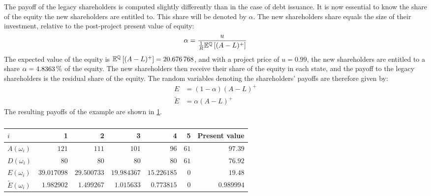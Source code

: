 \documentclass[main.tex]{subfiles}
\begin{document}
        The payoff of the legacy shareholders is computed slightly differently than in the case of debt issuance. 
        It is now essential to know the share of the equity the new shareholders are entitled to.
        This share will be denoted by $\alpha$.
        The new shareholders share equals the size of their investment,
        relative to the post-project present value of equity:
        \begin{equation*}
            \alpha = 
                \frac{
                    u
                }{
                    \frac{1}{R}
                    \mathbb{E}^{\mathbb{Q}}\left[
                        (A - L)^{+}
                    \right]
                }
        \end{equation*}
        The expected value of the equity is 
        $\mathbb{E}^{\mathbb{Q}}\left[(A - L)^{+}\right] = \num{20.676768}$,
        and with a project price of $u = 0.99$, the new shareholders are entitled to a share
        $\alpha = \pct{0.048363}$ of the equity.
        The new shareholders then receive their share of the equity in each state, 
        and the payoff to the legacy shareholders is the residual share of the equity.
        The random variables denoting the shareholders' payoffs are therefore given by:
            \begin{align*}
                E 
                &= 
                (1 - \alpha)
                (A - L)^{+} 
                \\
                \tilde{E}
                &=
                \alpha
                (A - L)^{+}
            \end{align*}
        The resulting payoffs of the example are shown in \cref{tbl:equity-funding-payoff}.
        \begin{table}[H]
            \centering\begin{tabular}{l|rrrrr||r}
                $i$ & 1 & 2 & 3 & 4 & 5 & Present value \\
                \hline
                $A(\omega_{i})$ & $\num{121}$ & $\num{111}$ & $\num{101}$ & $\num{96}$ & $\num{61}$ & $\num{97.39}$ \\
                $D(\omega_{i})$ & $\num{80}$ & $\num{80}$ & $\num{80}$ & $\num{80}$ & $\num{61}$ & $\num{76.92}$ \\
                $E(\omega_{i})$ & $\num{39.017098}$ & $\num{29.500733}$ & $\num{19.984367}$ & $\num{15.226185}$ & $\num{0}$ & $\num{19.48}$ \\
                $\tilde{E}(\omega_{i})$ & $\num{1.982902}$ & $\num{1.499267}$ & $\num{1.015633}$ & $\num{0.773815}$ & $\num{0}$ & $\num{0.989994}$ \\
            \end{tabular}
            \caption{}
            \label{tbl:equity-funding-payoff}
        \end{table}
\end{document}
